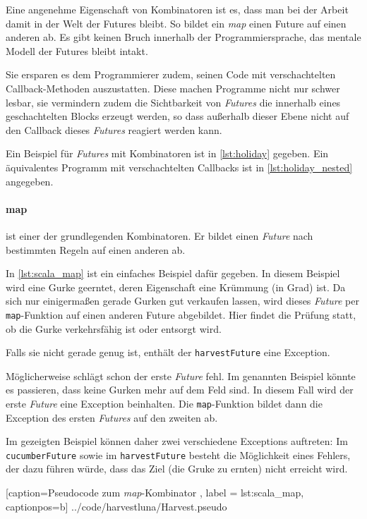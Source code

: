 Eine angenehme Eigenschaft von Kombinatoren ist es, dass man bei
der Arbeit damit in der Welt der Futures bleibt. So bildet
ein \emph{map} einen Future auf einen anderen ab. Es gibt keinen
Bruch innerhalb der Programmiersprache, das mentale Modell der
Futures bleibt intakt.

Sie ersparen es dem Programmierer zudem, seinen Code mit verschachtelten
Callback-Methoden auszustatten. Diese machen Programme nicht nur
schwer lesbar, sie vermindern zudem die Sichtbarkeit von \emph{Futures}
die innerhalb eines geschachtelten Blocks erzeugt werden, so dass
außerhalb dieser Ebene nicht auf den Callback dieses \emph{Futures}
reagiert werden kann.

Ein Beispiel für \emph{Futures} mit Kombinatoren ist in \ref{lst:holiday}
gegeben. Ein äquivalentes Programm mit verschachtelten Callbacks
ist in \ref{lst:holiday_nested} angegeben.

\paragraph{map} ist einer der grundlegenden Kombinatoren. Er bildet
einen \emph{Future} nach bestimmten Regeln auf einen anderen ab.

In \ref{lst:scala_map} ist ein einfaches Beispiel dafür gegeben.
In diesem Beispiel wird eine Gurke geerntet, deren Eigenschaft eine
Krümmung (in Grad) ist. Da sich nur einigermaßen gerade
Gurken gut verkaufen lassen, wird dieses \emph{Future} per \texttt{map}-Funktion
auf einen anderen Future abgebildet. Hier findet die Prüfung statt, ob
die Gurke verkehrsfähig ist oder entsorgt wird.

Falls sie nicht gerade genug ist, enthält der \texttt{harvestFuture}
eine Exception.

Möglicherweise schlägt schon der erste \emph{Future} fehl. Im genannten
Beispiel könnte es passieren, dass keine Gurken mehr auf dem Feld sind.
In diesem Fall wird der erste \emph{Future} eine Exception beinhalten.
Die \texttt{map}-Funktion bildet dann die Exception des
ersten \emph{Futures} auf den zweiten ab.

Im gezeigten Beispiel können daher zwei verschiedene Exceptions auftreten:
Im \texttt{cucumberFuture} sowie im \texttt{harvestFuture} besteht
die Möglichkeit eines Fehlers, der dazu führen würde, dass das Ziel
(die Gruke zu ernten) nicht erreicht wird.


    [caption={Pseudocode zum \emph{map}-Kombinator },
       label = lst:scala_map,
       captionpos=b]
 {../code/harvestluna/Harvest.pseudo}
 
